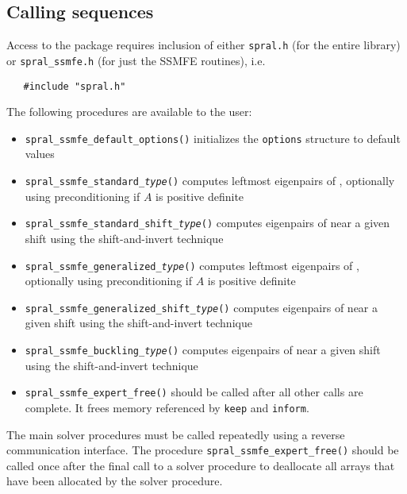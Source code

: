 \subsection{Calling sequences}

Access to the package requires inclusion of either \texttt{spral.h} (for the
entire \spral library) or \texttt{spral\_ssmfe.h} (for just the SSMFE routines), i.e.

\begin{verbatim}
   #include "spral.h"
\end{verbatim}

\noindent The following procedures are available to the user:
%
\begin{itemize}
\vspace{-0.1cm}
\item {\tt spral\_ssmfe\_default\_options()} initializes the \texttt{options} structure to default values
\item {\tt spral\_ssmfe\_standard\_\textit{type}()} 
computes leftmost eigenpairs of , 
optionally using preconditioning if $A$ is positive definite
\item {\tt spral\_ssmfe\_standard\_shift\_\textit{type}()} 
computes eigenpairs of  near a given shift
using the shift-and-invert technique
\item {\tt spral\_ssmfe\_generalized\_\textit{type}()} 
computes leftmost eigenpairs of 
, optionally using preconditioning if $A$ is positive definite
\item {\tt spral\_ssmfe\_generalized\_shift\_\textit{type}()} 
computes eigenpairs of 
 near a given shift
using the shift-and-invert technique
\item {\tt spral\_ssmfe\_buckling\_\textit{type}()} 
computes eigenpairs of 
 near a given shift
using the shift-and-invert technique
\item {\tt spral\_ssmfe\_expert\_free()} should be called after all other calls
are complete. It frees memory referenced by \texttt{keep} and \texttt{inform}.
%
\end{itemize}

The main solver procedures
must be called repeatedly using
a reverse communication interface.
The procedure \texttt{spral\_ssmfe\_expert\_free()}
should be called once after the
final call to 
a solver procedure
to deallocate all arrays 
that have been allocated by
the solver procedure.

